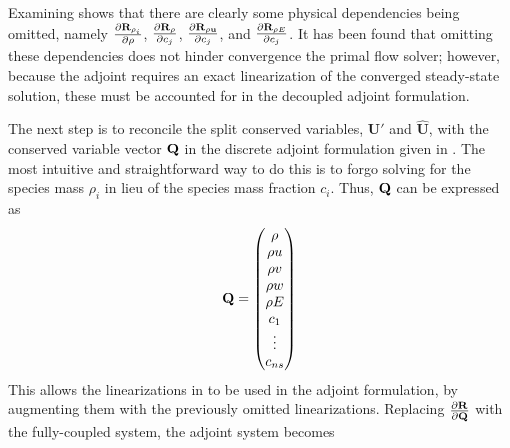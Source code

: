 Examining  shows that there are clearly some
physical dependencies being omitted, namely $\frac{\partial \mathbf R_{\rho_i}}{\partial \rho}$,
$\frac{\partial \mathbf R_{\rho}}{\partial c_j}$, $\frac{\partial \mathbf R_{\rho \mathbf u}}{\partial c_j}$, and $\frac{\partial \mathbf R_{\rho E}}{\partial c_j}$.  It has
been found\cite{candler} that omitting these dependencies does not hinder convergence
the primal flow solver; however, because the adjoint requires an exact
linearization of the converged steady-state solution, these must be accounted
for in the decoupled adjoint formulation.

The next step is to reconcile the split conserved variables, $\mathbf{U}'$ and
$\mathbf{\hat{U}}$, with the conserved variable vector $\mathbf Q$ in the discrete
adjoint formulation given in . The most intuitive and
straightforward way to do this is to forgo solving for the species mass $\rho_i$
in lieu of the species mass fraction $c_i$.  Thus, $\mathbf Q$ can be expressed as
\begin{equation}
  \mathbf Q =
  \begin{pmatrix}
  	\rho \\
  	\rho u \\
  	\rho v \\
  	\rho w \\
  	\rho E \\
    c_1 \\
    \vdots \\
    c_{ns}
  \end{pmatrix}
  \label{q-vec}
\end{equation}
This allows the linearizations in  to be used
in the adjoint formulation, by augmenting them with the previously omitted
linearizations.  Replacing $\frac{\partial \mathbf R_{}}{\partial \mathbf Q}$ with the fully-coupled system, the
adjoint system becomes
